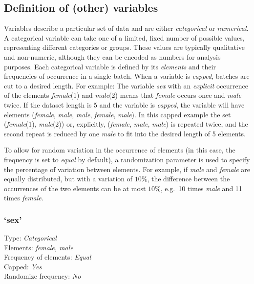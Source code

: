 \documentclass[11pt]{scrartcl}\usepackage[]{graphicx}\usepackage[table]{xcolor}
\begin{document}
\subsection{Definition of (other) variables }
Variables describe a particular set of data and are either \textit{categorical} or \textit{numerical}. A categorical variable can take one of a limited, fixed number of possible values, representing different categories or groups. 
These values are typically qualitative and non-numeric, although they can be encoded as numbers for analysis purposes. Each categorical variable is defined by its \textit{elements} and their frequencies of occurrence in a single batch. When a variable is \textit{capped}, batches are cut to a desired length. For example: The variable \textit{sex} with an \textit{explicit} occurrence of the elements \textit{female}(1) and \textit{male}(2) means that \textit{female} occurs once and \textit{male} twice. If the dataset length is 5 and the variable is \textit{capped}, the variable will have elements (\textit{female}, \textit{male}, \textit{male}, \textit{female}, \textit{male}). In this capped example the set (\textit{female}(1), \textit{male}(2)) or, explicitly, (\textit{female}, \textit{male}, \textit{male}) is repeated twice, and the second repeat is reduced by one \textit{male} to fit into the desired length of 5 elements. 

To allow for random variation in the occurrence of elements (in this case, the frequency is set to \textit{equal} by default), a randomization parameter is used to specify the percentage of variation between elements. For example, if \textit{male} and \textit{female} are equally distributed, but with a variation of $10\%$, the difference between the occurrences of the two elements can be at most $10\%$, e.g.\ 10 times \textit{male} and 11 times \textit{female}. \\\subsubsection{`sex'}
Type: \textit{Categorical} \\
Elements: \textit{female, male} \\
Frequency of elements: \textit{Equal} \\
Capped: \textit{Yes} \\
Randomize frequency: \textit{No} \\
\end{document}
